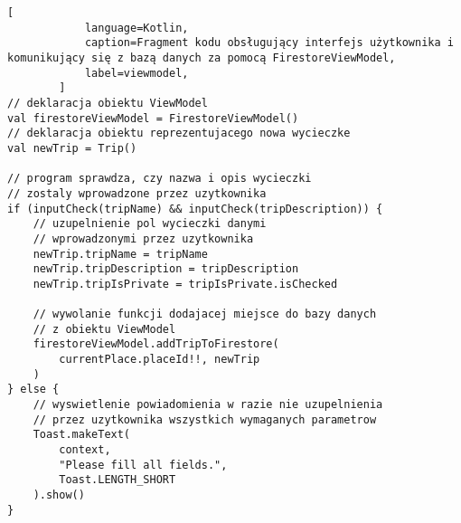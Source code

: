 \newpage
        \begin{lstlisting}[
            language=Kotlin, 
            caption=Fragment kodu obsługujący interfejs użytkownika i komunikujący się z bazą danych za pomocą FirestoreViewModel, 
            label=viewmodel,
        ]
// deklaracja obiektu ViewModel
val firestoreViewModel = FirestoreViewModel()
// deklaracja obiektu reprezentujacego nowa wycieczke
val newTrip = Trip()

// program sprawdza, czy nazwa i opis wycieczki 
// zostaly wprowadzone przez uzytkownika
if (inputCheck(tripName) && inputCheck(tripDescription)) {
    // uzupelnienie pol wycieczki danymi 
    // wprowadzonymi przez uzytkownika
    newTrip.tripName = tripName
    newTrip.tripDescription = tripDescription
    newTrip.tripIsPrivate = tripIsPrivate.isChecked

    // wywolanie funkcji dodajacej miejsce do bazy danych
    // z obiektu ViewModel
    firestoreViewModel.addTripToFirestore(
        currentPlace.placeId!!, newTrip
    )
} else {
    // wyswietlenie powiadomienia w razie nie uzupelnienia 
    // przez uzytkownika wszystkich wymaganych parametrow
    Toast.makeText(
        context, 
        "Please fill all fields.", 
        Toast.LENGTH_SHORT
    ).show()
}
        \end{lstlisting}
        \vspace{1cm}